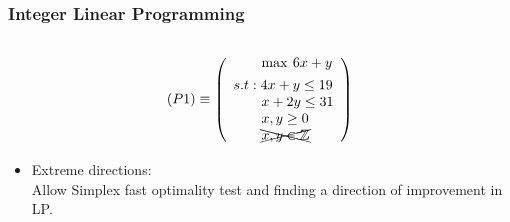 \documentclass{beamer}
\begin{document}
\begin{frame}
        \addtocounter{framenumber}{-1}

    \end{frame}
    
        \begin{frame}
        \frametitle{Integer Linear Programming}
        
        \begin{columns}[T] %
        \begin{column}{.48\textwidth}
        \begin{equation*}
            (P1) \equiv 	\left( \begin{array}{l}
	                        \qquad \max \hspace{2pt}  6x + y  \vspace{4pt} \\ 
	                        s.t: 4x + y \leq 19 \\
	                        \qquad x + 2y \leq 31 \\
	                        \qquad x,y\geq 0 \\
	                        \qquad \xcancel{x,y \in \mathbb{Z}}
	                        \end{array} \right)
        \end{equation*}
        \begin{itemize}
            \item Extreme directions: \\
            Allow Simplex fast optimality test and finding a direction of improvement in LP. 
            

\end{itemize}
\end{column}
\end{columns}
\end{frame}
\end{document}
